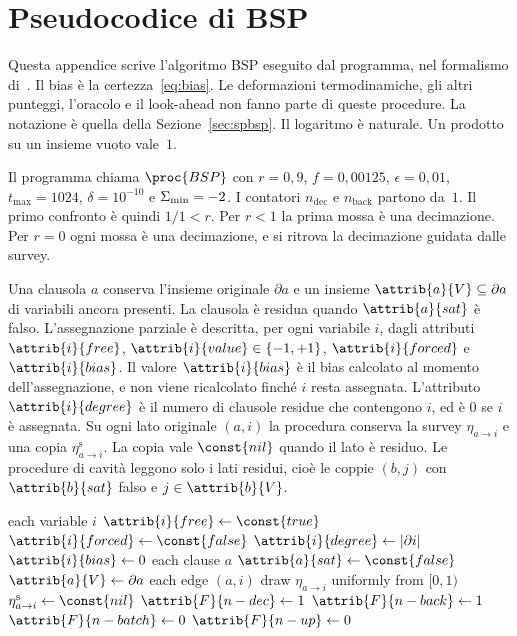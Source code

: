 \section{Pseudocodice di BSP}
\label{app:bsp}

Questa appendice scrive l'algoritmo BSP eseguito dal programma, nel formalismo di~\citep{cormen2009introduction}.
Il bias è la certezza~\eqref{eq:bias}.
Le deformazioni termodinamiche, gli altri punteggi, l'oracolo e il look-ahead non fanno parte di queste procedure.
La notazione è quella della Sezione~\ref{sec:spbsp}.
Il logaritmo è naturale.
Un prodotto su un insieme vuoto vale~$1$.

Il programma chiama $\proc{BSP}$ con $r=0{,}9$, $f=0{,}00125$, $\epsilon=0{,}01$, $t_{\max}=1024$, $\delta=10^{-10}$ e $\Sigma_{\min}=-2$.
I contatori $n_{\mathrm{dec}}$ e $n_{\mathrm{back}}$ partono da~$1$.
Il primo confronto è quindi $1/1<r$.
Per $r<1$ la prima mossa è una decimazione.
Per $r=0$ ogni mossa è una decimazione, e si ritrova la decimazione guidata dalle survey.

Una clausola $a$ conserva l'insieme originale $\partial a$ e un insieme $\attrib{a}{V}\subseteq\partial a$ di variabili ancora presenti.
La clausola è residua quando $\attrib{a}{sat}$ è falso.
L'assegnazione parziale è descritta, per ogni variabile $i$, dagli attributi $\attrib{i}{free}$, $\attrib{i}{value}\in\{-1,+1\}$, $\attrib{i}{forced}$ e $\attrib{i}{bias}$.
Il valore $\attrib{i}{bias}$ è il bias calcolato al momento dell'assegnazione, e non viene ricalcolato finché $i$ resta assegnata.
L'attributo $\attrib{i}{degree}$ è il numero di clausole residue che contengono $i$, ed è $0$ se $i$ è assegnata.
Su ogni lato originale $(a,i)$ la procedura conserva la survey $\eta_{a\to i}$ e una copia $\eta^{\mathrm{s}}_{a\to i}$.
La copia vale $\const{nil}$ quando il lato è residuo.
Le procedure di cavità leggono solo i lati residui, cioè le coppie $(b,j)$ con $\attrib{b}{sat}$ falso e $j\in\attrib{b}{V}$.

\begin{codebox}
\li \For each variable $i$
\li     \Do
            $\attrib{i}{free} \gets \const{true}$
\li         $\attrib{i}{forced} \gets \const{false}$
\li         $\attrib{i}{degree} \gets |\partial i|$
\li         $\attrib{i}{bias} \gets 0$
        \End
\li \For each clause $a$
\li     \Do
            $\attrib{a}{sat} \gets \const{false}$
\li         $\attrib{a}{V} \gets \partial a$
        \End
\li \For each edge $(a,i)$
\li     \Do
            draw $\eta_{a \to i}$ uniformly from $[0,1)$
\li         $\eta^{\mathrm{s}}_{a \to i} \gets \const{nil}$
        \End
\li $\attrib{F}{n-dec} \gets 1$
\li $\attrib{F}{n-back} \gets 1$
\li $\attrib{F}{n-batch} \gets 0$
\li $\attrib{F}{n-up} \gets 0$
\end{codebox}


